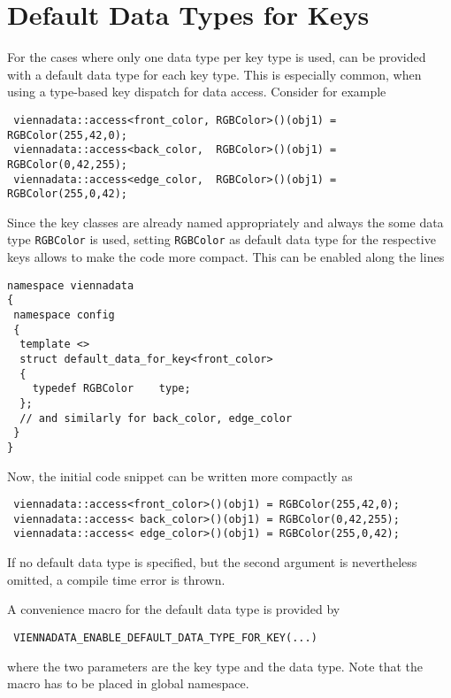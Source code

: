 \section{Default Data Types for Keys} \label{sec:default-valuetype}
For the cases where only one data type per key type is used, {\ViennaData} can be provided with a default data type for each key type.
This is especially common, when using a type-based key dispatch for data access. Consider for example
\begin{lstlisting}
 viennadata::access<front_color, RGBColor>()(obj1) = RGBColor(255,42,0);
 viennadata::access<back_color,  RGBColor>()(obj1) = RGBColor(0,42,255);
 viennadata::access<edge_color,  RGBColor>()(obj1) = RGBColor(255,0,42);
\end{lstlisting}
Since the key classes are already named appropriately and always the some data type \lstinline|RGBColor| is used, 
setting \lstinline|RGBColor| as default data type for the respective keys allows to make the code more compact.
This can be enabled along the lines
\begin{lstlisting}
namespace viennadata
{
 namespace config
 {
  template <>
  struct default_data_for_key<front_color>
  {
    typedef RGBColor    type;
  };
  // and similarly for back_color, edge_color
 }
} 
\end{lstlisting}
Now, the initial code snippet can be written more compactly as
\begin{lstlisting}
 viennadata::access<front_color>()(obj1) = RGBColor(255,42,0);
 viennadata::access< back_color>()(obj1) = RGBColor(0,42,255);
 viennadata::access< edge_color>()(obj1) = RGBColor(255,0,42);
\end{lstlisting}
If no default data type is specified, but the second argument is nevertheless omitted, a compile time error is thrown.

A convenience macro for the default data type is provided by
\begin{lstlisting}
 VIENNADATA_ENABLE_DEFAULT_DATA_TYPE_FOR_KEY(...)
\end{lstlisting}
where the two parameters are the key type and the data type. Note that the macro has to be placed in global namespace.

